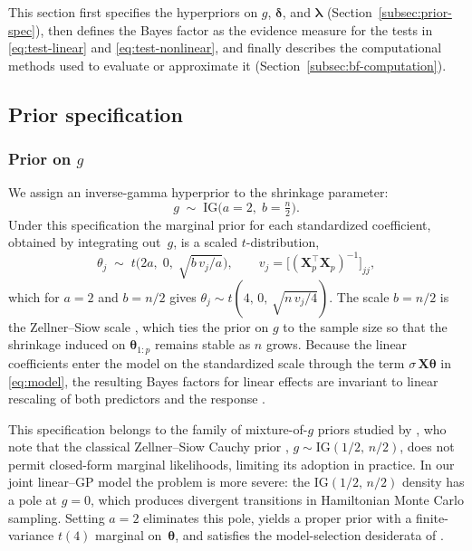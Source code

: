 \documentclass{article}
\begin{document}
This section first specifies the hyperpriors on
$g$, $\boldsymbol{\delta}$, and $\boldsymbol{\lambda}$
(Section~\ref{subsec:prior-spec}), then defines the Bayes factor as
the evidence measure for the tests in
\eqref{eq:test-linear} and \eqref{eq:test-nonlinear}, and finally describes
the computational methods used to evaluate or approximate it
(Section~\ref{subsec:bf-computation}).


\subsection{Prior specification\label{subsec:prior-spec}}


\subsubsection{Prior on \texorpdfstring{$g$}{g}\label{subsubsec:prior-g}}
 
We assign an inverse-gamma hyperprior to the shrinkage parameter:
%
\begin{equation}
\label{eq:prior-g}
g \;\sim\; \mathrm{IG}\!\bigl(a = 2,\; b = \tfrac{n}{2}\bigr).
\end{equation}
%
Under this specification the marginal prior for each standardized
coefficient, obtained by integrating out~$g$, is a scaled
$t$-distribution,
%
\begin{equation}
\label{eq:marginal-theta}
\theta_j \;\sim\; t\!\bigl(2a,\; 0,\;
  \sqrt{b\,v_j / a}\bigr),
  \qquad v_j = \bigl[(\mathbf{X}_p^{\top}\!\mathbf{X}_p)^{-1}\bigr]_{jj},
\end{equation}
%
which for $a=2$ and $b=n/2$ gives $\theta_j \sim t(4,\,0,\,
\sqrt{n\,v_j/4})$.
The scale $b=n/2$ is the Zellner--Siow scale
\parencite{ZellnerSiow1980, Liang2008}, which ties the prior on $g$ to
the sample size so that the shrinkage induced on
$\boldsymbol{\theta}_{1:p}$ remains stable as $n$ grows.
Because the linear coefficients enter the model on the standardized
scale through the term $\sigma\,\mathbf{X}\boldsymbol{\theta}$ in
\eqref{eq:model}, the resulting Bayes factors for linear effects are
invariant to linear rescaling of both predictors and the response
\parencite{Rouder2012}.
 
This specification belongs to the family of mixture-of-$g$ priors
studied by \textcite{Liang2008}, who note that the classical
Zellner--Siow Cauchy prior \parencite{ZellnerSiow1980}, $g \sim \mathrm{IG}(1/2,\, n/2)$, does not
permit closed-form marginal likelihoods, limiting its adoption in
practice.
In our joint linear--GP model the problem is more severe: the
$\mathrm{IG}(1/2,\, n/2)$ density has a pole at $g = 0$, which
produces divergent transitions in Hamiltonian Monte Carlo sampling.
Setting $a = 2$ eliminates this pole, yields a proper prior with a
finite-variance $t(4)$ marginal on~$\boldsymbol{\theta}$, and
satisfies the model-selection desiderata of
\textcite{Bayarri2012}.
\end{document}
